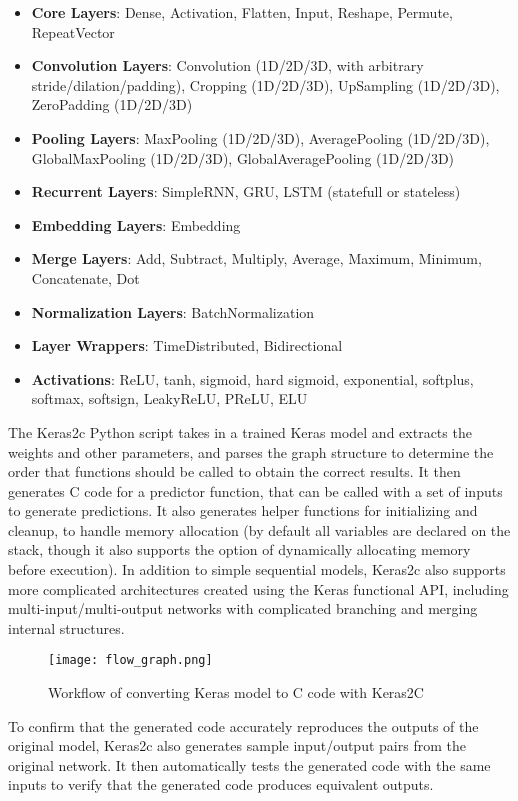 \documentclass{article}
\begin{document}
\begin{itemize}
  \setlength\itemsep{0em}
\item
  \textbf{Core Layers}: Dense, Activation, Flatten, Input, Reshape, Permute, RepeatVector
\item
  \textbf{Convolution Layers}: Convolution (1D/2D/3D, with arbitrary stride/dilation/padding), Cropping (1D/2D/3D), UpSampling (1D/2D/3D), ZeroPadding (1D/2D/3D)
\item
  \textbf{Pooling Layers}: MaxPooling (1D/2D/3D), AveragePooling (1D/2D/3D), GlobalMaxPooling (1D/2D/3D), GlobalAveragePooling (1D/2D/3D)
\item
  \textbf{Recurrent Layers}: SimpleRNN, GRU, LSTM (statefull or stateless)
\item
  \textbf{Embedding Layers}: Embedding
\item
  \textbf{Merge Layers}: Add, Subtract, Multiply, Average, Maximum, Minimum, Concatenate, Dot
\item
  \textbf{Normalization Layers}: BatchNormalization
\item
  \textbf{Layer Wrappers}: TimeDistributed, Bidirectional
\item
  \textbf{Activations}: ReLU, tanh, sigmoid, hard sigmoid, exponential, softplus, softmax, softsign, LeakyReLU, PReLU, ELU
\end{itemize}



The Keras2c Python script takes in a trained Keras model and extracts
the weights and other parameters, and parses the graph structure to
determine the order that functions should be called to obtain the
correct results. It then generates C code for a predictor function, that
can be called with a set of inputs to generate predictions. It also
generates helper functions for initializing and cleanup, to handle
memory allocation (by default all variables are declared on the stack,
though it also supports the option of dynamically allocating memory
before execution). In addition to simple sequential models, Keras2c also
supports more complicated architectures created using the Keras
functional API, including multi-input/multi-output networks with
complicated branching and merging internal structures.
\begin{figure}[h!]
\centering
\texttt{[image: flow\_graph.png]}
\caption{Workflow of converting Keras model to C code with Keras2C}
\end{figure}

To confirm that the generated code accurately reproduces the outputs of
the original model, Keras2c also generates sample input/output pairs
from the original network. It then automatically tests the generated
code with the same inputs to verify that the generated code produces
equivalent outputs.
\end{document}
